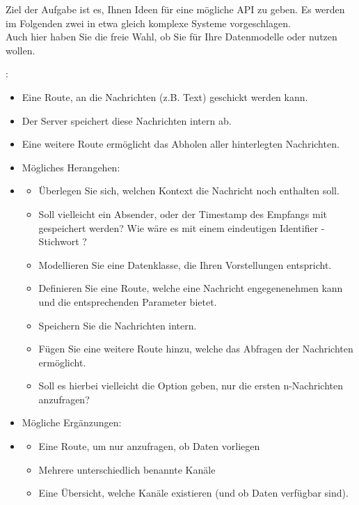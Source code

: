 \documentclass{ubo_tex_uebungszettel/uebungszettel}
\theoremstyle{definition}
\newcommand{\pp}[1]{\lpl{#1}}
\begin{document}
    \pagebreak

    \medskip
    \noindent {} \quad
    
        \noindent Ziel der Aufgabe ist es, Ihnen Ideen für eine mögliche API zu geben. Es werden im Folgenden zwei in etwa gleich komplexe Systeme vorgeschlagen.\\
        Auch hier haben Sie die freie Wahl, ob Sie für Ihre Datenmodelle \pp{Pydantic} oder \pp{dataclass} nutzen wollen.

        \noindent
        :
        \begin{itemize}
            \item Eine Route, an die Nachrichten (z.B. Text) geschickt werden kann.
            \item Der Server speichert diese Nachrichten intern ab.
            \item Eine weitere Route ermöglicht das Abholen aller hinterlegten Nachrichten.
            \item[] Mögliches Herangehen:
            \item[] \begin{itemize}
                \item Überlegen Sie sich, welchen Kontext die Nachricht noch enthalten soll.
                \item[] Soll vielleicht ein Absender, oder der Timestamp des Empfangs mit gespeichert werden? Wie wäre es mit einem eindeutigen Identifier - Stichwort \pp{uuid}?
                \item Modellieren Sie eine Datenklasse, die Ihren Vorstellungen entspricht.
                \item Definieren Sie eine Route, welche eine Nachricht engegenenehmen kann und die entsprechenden Parameter bietet.
                \item Speichern Sie die Nachrichten intern.
                \item Fügen Sie eine weitere Route hinzu, welche das Abfragen der Nachrichten ermöglicht.
                \item[] Soll es hierbei vielleicht die Option geben, nur die ersten n-Nachrichten anzufragen?
            \end{itemize}
            \item Mögliche Ergänzungen:
            \item[] \begin{itemize}
                \item Eine Route, um nur anzufragen, ob Daten vorliegen
                \item Mehrere unterschiedlich benannte Kanäle
                \item Eine Übersicht, welche Kanäle existieren (und ob Daten verfügbar sind).
            \end{itemize}
        \end{itemize}
\end{document}
